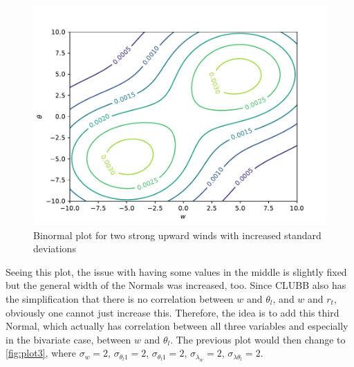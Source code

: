 \begin{figure}
    \centering
    \includegraphics[width=.5\textwidth]{include/figures/plot2}
    \caption{Binormal plot for two strong upward winds with increased standard deviations}
    \label{fig:plot2}
\end{figure}

Seeing this plot, the issue with having some values in the middle is slightly fixed but the general width of the Normals was increased, too.
Since \gls{CLUBB} also has the simplification that there is no correlation between $w$ and $\theta_l$, and $w$ and $r_t$, obviously one cannot just increase this.
Therefore, the idea is to add this third Normal, which actually has correlation between all three variables and especially in the bivariate case, between $w$ and $\theta_l$.
The previous plot would then change to \autoref{fig:plot3}, where $\sigma_w = 2$, $\sigma_{\theta_l1} = 2$,  $\sigma_{\theta_l1} = 2$, $\sigma_{\lambda_w} = 2$, $\sigma_{\lambda\theta_l} = 2$.

